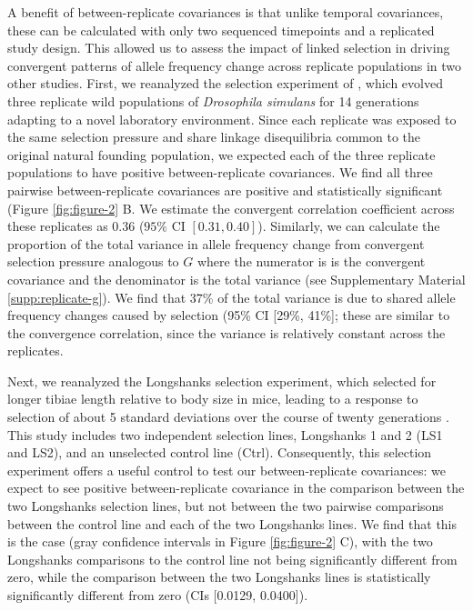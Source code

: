 \documentclass[11pt]{article}
\begin{document}
A benefit of between-replicate covariances is that unlike temporal covariances,
these can be calculated with only two sequenced timepoints and a replicated
study design. This allowed us to assess the impact of linked selection in
driving convergent patterns of allele frequency change across replicate
populations in two other studies. First, we reanalyzed the selection experiment
of \textcite{Kelly2019-dc}, which evolved three replicate wild populations of
\emph{Drosophila simulans} for 14 generations adapting to a novel laboratory
environment. Since each replicate was exposed to the same selection pressure
and share linkage disequilibria common to the original natural founding
population, we expected each of the three replicate populations to have
positive between-replicate covariances. We find all three pairwise
between-replicate covariances are positive and statistically significant
(Figure \ref{fig:figure-2} B. We estimate the convergent correlation
coefficient across these replicates as 0.36 ($95\%$ CI $[0.31, 0.40]$).
Similarly, we can calculate the proportion of the total variance in allele
frequency change from convergent selection pressure analogous to $G$ where the
numerator is is the convergent covariance and the denominator is the total
variance (see Supplementary Material \ref{supp:replicate-g}). We find that 37\%
of the total variance is due to shared allele frequency changes caused by
selection (95\% CI [29\%, 41\%]; these are similar to the convergence
correlation, since the variance is relatively constant across the replicates.


Next, we reanalyzed the Longshanks selection experiment, which selected for
longer tibiae length relative to body size in mice, leading to a response to
selection of about 5 standard deviations over the course of twenty generations
\parencite{Marchini2014-de,Castro2019-uk}. This study includes two independent
selection lines, Longshanks 1 and 2 (LS1 and LS2), and an unselected control
line (Ctrl).  Consequently, this selection experiment offers a useful control
to test our between-replicate covariances: we expect to see positive
between-replicate covariance in the comparison between the two Longshanks
selection lines, but not between the two pairwise comparisons between the
control line and each of the two Longshanks lines. We find that this is
the case (gray confidence intervals in Figure \ref{fig:figure-2} C), with the
two Longshanks comparisons to the control line not being significantly
different from zero, while the comparison between the two Longshanks lines is
statistically significantly different from zero (CIs [0.0129, 0.0400]).
\end{document}
